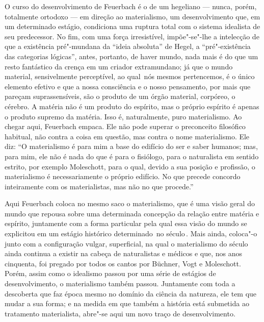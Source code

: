O curso do desenvolvimento
de Feuerbach é
o de um hegeliano --- nunca, porém, totalmente ortodoxo --- em direção ao
materialismo, um desenvolvimento que, em um determinado estágio,
condiciona uma ruptura total com o sistema idealista de seu predecessor.
No fim, com uma força irresistível, impõe"-se"-lhe a intelecção de que a
existência pré"-mundana da ``ideia absoluta''
de Hegel,
a ``pré"-existência das categorias lógicas'', antes, portanto, de haver
mundo, nada mais é do que um resto fantástico da crença em um criador
extramundano; já que o mundo material, sensivelmente perceptível, ao
qual\est\ nós mesmos pertencemos, é o único elemento efetivo e que a nossa
consciência e o nosso pensamento, por mais que pareçam suprassensíveis, são o
produto de um órgão material, corpóreo, o cérebro. A matéria não é um
produto do espírito, mas o próprio espírito é apenas 
o produto supremo da matéria. Isso é, naturalmente, 
puro materialismo. Ao chegar aqui, Feuerbach empaca. Ele não pode
superar o preconceito filosófico habitual, não contra a
coisa em questão, mas contra o nome materialismo. Ele diz: ``O
materialismo é para mim a base do edifício do ser e saber humanos; mas,
para mim, ele não é nada do que é para o fisiólogo, para o naturalista em
sentido estrito, por exemplo Moleschott,
para o qual, devido a sua posição e profissão, o materialismo é necessariamente o próprio
edifício. No que precede concordo inteiramente com os materialistas, mas
não no que procede.''

Aqui
Feuerbach coloca
no mesmo saco o materialismo, que é uma visão geral do mundo que repousa
sobre uma determinada concepção da relação entre matéria e espírito,
juntamente com a forma particular pela qual essa visão do mundo se
explicitou em um estágio histórico determinado \textbar{}\,no século\,. \textbar{} %
Mais ainda, coloca"-o junto com a configuração vulgar, superficial, na qual
o materialismo do século  ainda continua a existir na cabeça
de naturalistas e médicos e que, nos anos cinquenta, foi pregado por
todos os cantos
por Büchner, Vogt e Moleschott. Porém,
assim como o idealismo passou por uma série de estágios de
desenvolvimento, o materialismo também passou. Juntamente com toda a descoberta
que faz época mesmo no domínio da ciência da natureza, ele tem que mudar
a sua forma; e na medida em que também a história está submetida ao
tratamento materialista, abre"-se aqui um novo traço de
desenvolvimento.

